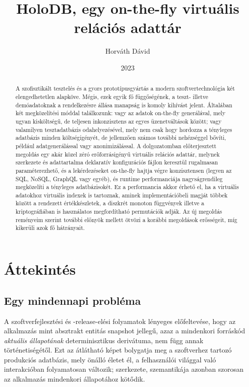 \documentclass[
    parspace,
    noindent,
    nohyp,
]{elteiktdk}[2023/04/10]
\title{HoloDB, egy on-the-fly virtuális relációs adattár}
\date{2023}
\author{Horváth Dávid}
\affiliation{PhD, Mesteroktató}
\begin{document}

\listoftodos
\cleardoublepage

\makecover
\cleardoublepage

\maketitle

\tableofcontents
\cleardoublepage


\begin{abstract}
A szofisztikált tesztelés és a gyors prototípusgyártás
a modern szoftvertechnológia két elengedhetetlen alapköve.
Mégis, ezek egyik fő függőségének, a teszt- illetve demóadatoknak
a rendelkezésre állása manapság is komoly kihívást jelent.
Általában két megközelítési móddal találkozunk:
vagy az adatok on-the-fly generálával, mely ugyan kisköltségű,
de teljesen inkonzisztens az egyes üzenetváltások között;
vagy valamilyen tesztadatbázis odahelyezésével,
mely nem csak hogy hordozza a tényleges adatbázis minden költségigényét,
de jellemzően számos további nehézséggel bővíti, például adatgenerálással vagy anonimizálással.
A dolgozatomban előterjesztett megoldás egy akár közel zéró erőforrásigényű virtuális relációs adattár,
melynek szerkezete és adattartalma deklaratív
konfigurációs fájlon keresztül rugalmasan paraméterezhető,
és a lekérdezéseket on-the-fly hajtja végre konzisztensen
(legyen az SQL, NoSQL, GraphQL vagy egyéb),
és runtime performanciája nagyságrendileg megközelíti a tényleges adatbázisokét.
Ez a performancia akkor érhető el, ha a virtuális adatokhoz virtuális indexek is tartoznak,
aminek implementációbeli magját többek között a rendezett értékkészletek,
a diszkrét monoton függvények
illetve a kriptográfiában is használatos megfordítható permutációk adják.
Az új megoldás reményeim szerint további előnyök mellett ötvözi a korábbi megoldások erősségeit,
míg kikerüli azok fő hátrányait.
\end{abstract}

\chapter{Áttekintés}

\section{Egy mindennapi probléma}

A szoftverfejlesztési és -release-elési folyamatok lényeges előfeltevése,
hogy az alkalmazás mint absztrakt entitás snapshot jellegű,
azaz a mindenkori forráskód \textit{aktuális állapotának} determinisztikus derivátuma,
nem függ annak történetiségétől.
Ezt az átlátható képet bolygatja meg a szoftverhez tartozó produkciós adatbázis,
mely önálló életet él, a felhasználói világgal való interakcióban folyamatosan változik;
szerkezete, szemantikája azonban szorosan az alkalmazás mindenkori állapotához kötődik.
\end{document}
